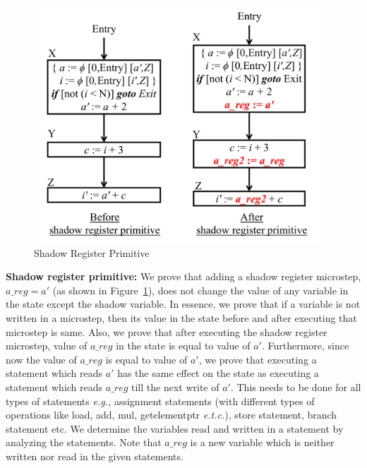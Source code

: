   
   
\begin{figure}[H]
\begin{center}
\includegraphics[height=3.5in]{fig-proposal/shadow-reg-primitive}
\end{center}
\caption{Shadow Register Primitive}
\label{fig:primitives2}
\end{figure}
 
{\bf Shadow register primitive:} We prove that adding
  a shadow register microstep, $a\_reg = a'$ (as shown in Figure~\ref{fig:primitives2}),
  does not change the value of any variable in the state except the shadow variable. 
  In essence, we prove
  that if a variable is not written in a microstep, then its value in the state before and after executing
  that microstep is same. Also, we prove that after executing the shadow register microstep,
  value of $a\_reg$ in the state is equal to value of $a'$. Furthermore, since now
  the value of $a\_reg$ is equal to value
  of $a'$, we prove that executing a statement which reads $a'$ has the same
  effect on the state as executing a statement which reads
  $a\_reg$ till the next write of $a'$. This needs to be done for all types of
  statements {\em e.g.,} assignment statements (with different types of 
  operations like load, add, mul, getelementptr {\em e.t.c.}), 
  store statement, branch statement etc. We determine the variables read and 
  written in a statement by analyzing the statements. 
  Note that $a\_reg$ is a new variable which
  is neither written nor read in the given statements.


